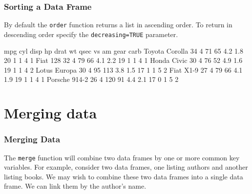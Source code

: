 \documentclass[10pt,slidestop,mathserif,c]{beamer}
\begin{document}
\begin{frame}
	\frametitle{Sorting a Data Frame}

	By default the \texttt{order} function returns a list in ascending order. To return in descending order specify the \texttt{decreasing=TRUE} parameter.

\begin{Schunk}
\begin{Soutput}
               mpg cyl disp  hp drat  wt qsec vs am gear carb
Toyota Corolla  34   4   71  65  4.2 1.8   20  1  1    4    1
Fiat 128        32   4   79  66  4.1 2.2   19  1  1    4    1
Honda Civic     30   4   76  52  4.9 1.6   19  1  1    4    2
Lotus Europa    30   4   95 113  3.8 1.5   17  1  1    5    2
Fiat X1-9       27   4   79  66  4.1 1.9   19  1  1    4    1
Porsche 914-2   26   4  120  91  4.4 2.1   17  0  1    5    2
\end{Soutput}
\end{Schunk}

\end{frame}



\section{Merging data}

\begin{frame}
	\frametitle{Merging Data}
	
	The \texttt{merge} function will combine two data frames by one or more common key variables. For example, consider two data frames, one listing authors and another listing books. We may wish to combine these two data frames into a single data frame. We can link them by the author's name.
\end{frame}
\end{document}
